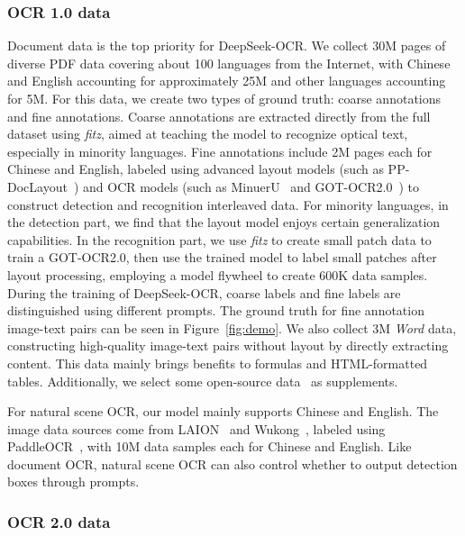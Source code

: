 \documentclass[11pt, a4paper, logo, copyright, nonumbering]{deepseek}
\begin{document}
\begin{CJK*}{UTF8}{gbsn}
\begin{figure}[h]
\end{figure}


\subsubsection{OCR 1.0 data}
Document data is the top priority for DeepSeek-OCR. We collect 30M pages of diverse PDF data covering about 100 languages from the Internet, with Chinese and English accounting for approximately 25M and other languages accounting for 5M. For this data, we create two types of ground truth: coarse annotations and fine annotations. Coarse annotations are extracted directly from the full dataset using \textit{fitz}, aimed at teaching the model to recognize optical text, especially in minority languages. Fine annotations include 2M pages each for Chinese and English, labeled using advanced layout models (such as PP-DocLayout~\cite{sun2025pp}) and OCR models (such as MinuerU~\cite{wang2024mineru} and GOT-OCR2.0~\cite{wei2024general}) to construct detection and recognition interleaved data. For minority languages, in the detection part, we find that the layout model enjoys certain generalization capabilities. In the recognition part, we use \textit{fitz} to create small patch data to train a GOT-OCR2.0, then use the trained model to label small patches after layout processing, employing a model flywheel to create 600K data samples. During the training of DeepSeek-OCR, coarse labels and fine labels are distinguished using different prompts. The ground truth for fine annotation image-text pairs can be seen in Figure~\ref{fig:demo}. We also collect 3M \textit{Word} data, constructing high-quality image-text pairs without layout by directly extracting content. This data mainly brings benefits to formulas and HTML-formatted tables. Additionally, we select some open-source data~\cite{poznanski2025olmocr,wei2024small} as supplements. 

For natural scene OCR, our model mainly supports Chinese and English. The image data sources come from LAION~\cite{schuhmann2021laion} and Wukong~\cite{gu2022wukong}, labeled using PaddleOCR~\cite{cui2025paddleocr}, with 10M data samples each for Chinese and English. Like document OCR, natural scene OCR can also control whether to output detection boxes through prompts.



\subsubsection{OCR 2.0 data}


\end{CJK*}
\end{document}
